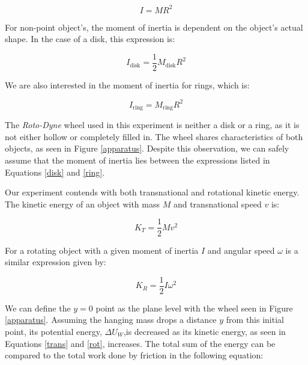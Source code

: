 \documentclass[12pt]{article}
\begin{document}
\begin{equation}
    I=MR^2 \label{Inertia}
\end{equation}

\indent For non-point object's, the moment of inertia is dependent on the object's actual shape. In the case of a disk, this expression is:

\begin{equation}
    I_{\text{disk}}=\frac{1}{2}M_{\text{disk}}R^2 \label{disk}
\end{equation}

\indent We are also interested in the moment of inertia for rings, which is:

\begin{equation}
    I_{\text{ring}}=M_{\text{ring}}R^2 \label{ring}
\end{equation}

\indent The \textit{Roto-Dyne} wheel used in this experiment is neither a disk or a ring, as it is not either hollow or completely filled in. The wheel shares characteristics of both objects, as seen in Figure \ref{apparatus}. Despite this observation, we can safely assume that the moment of inertia lies between the expressions listed in Equations \ref{disk} and \ref{ring}. \par 

Our experiment contends with both transnational and rotational kinetic energy. The kinetic energy of an object with mass $M$ and transnational speed $v$ is:

\begin{equation}
    K_T=\frac{1}{2}Mv^2 \label{trans}
\end{equation}

\indent For a rotating object with a given moment of inertia $I$ and angular speed $\omega$ is a similar expression given by:

\begin{equation}
    K_R=\frac{1}{2}I\omega^2 \label{rot}
\end{equation}


\indent We can define the $y=0$ point as the plane level with the wheel seen in Figure \ref{apparatus}. Assuming the hanging mass drops a distance $y$ from this initial point, its potential energy, $\Delta U_W$,is decreased as its kinetic energy, as seen in Equations \ref{trans} and \ref{rot}, increases. The total sum of the energy can be compared to the total work done by friction in the following equation:
\end{document}
